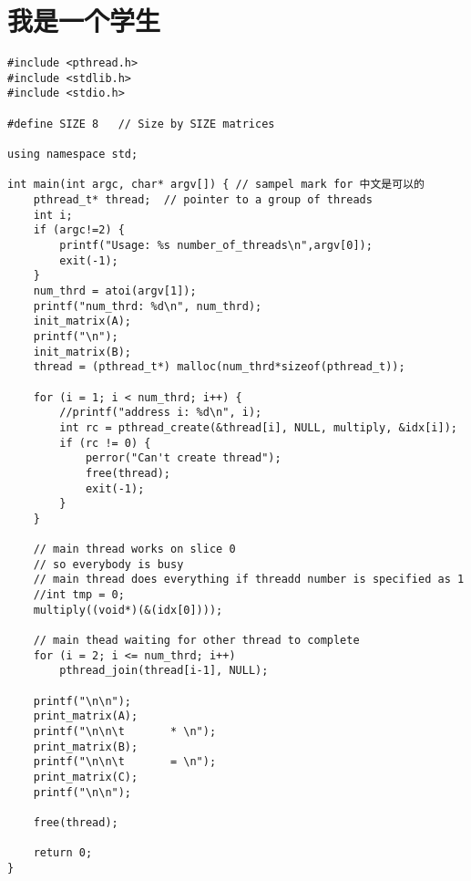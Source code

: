 \documentclass[9pt,b5paper]{article}
\begin{document}
\section{我是一个学生}
\label{sec-4}
\begin{verbatim}
#include <pthread.h>
#include <stdlib.h>
#include <stdio.h>

#define SIZE 8   // Size by SIZE matrices

using namespace std;

int main(int argc, char* argv[]) { // sampel mark for 中文是可以的
    pthread_t* thread;  // pointer to a group of threads
    int i;
    if (argc!=2) {    
        printf("Usage: %s number_of_threads\n",argv[0]);
        exit(-1);
    }
    num_thrd = atoi(argv[1]);
    printf("num_thrd: %d\n", num_thrd);
    init_matrix(A);
    printf("\n");
    init_matrix(B);
    thread = (pthread_t*) malloc(num_thrd*sizeof(pthread_t));

    for (i = 1; i < num_thrd; i++) {    
        //printf("address i: %d\n", i);
        int rc = pthread_create(&thread[i], NULL, multiply, &idx[i]);
        if (rc != 0) {
            perror("Can't create thread");
            free(thread);
            exit(-1);
        }
    }

    // main thread works on slice 0
    // so everybody is busy
    // main thread does everything if threadd number is specified as 1
    //int tmp = 0;
    multiply((void*)(&(idx[0])));

    // main thead waiting for other thread to complete
    for (i = 2; i <= num_thrd; i++)
        pthread_join(thread[i-1], NULL);

    printf("\n\n");
    print_matrix(A);
    printf("\n\n\t       * \n");
    print_matrix(B);
    printf("\n\n\t       = \n");
    print_matrix(C);
    printf("\n\n");

    free(thread);

    return 0;
}
\end{verbatim}
\end{document}
